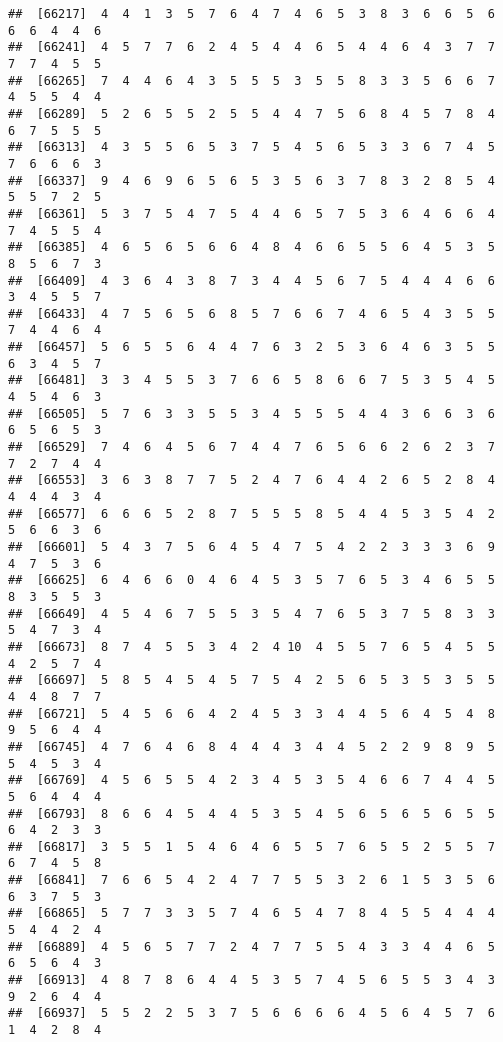 \documentclass[
]{book}
\begin{document}
\begin{verbatim}
##  [66217]  4  4  1  3  5  7  6  4  7  4  6  5  3  8  3  6  6  5  6  6  6  4  4  6
##  [66241]  4  5  7  7  6  2  4  5  4  4  6  5  4  4  6  4  3  7  7  7  7  4  5  5
##  [66265]  7  4  4  6  4  3  5  5  5  3  5  5  8  3  3  5  6  6  7  4  5  5  4  4
##  [66289]  5  2  6  5  5  2  5  5  4  4  7  5  6  8  4  5  7  8  4  6  7  5  5  5
##  [66313]  4  3  5  5  6  5  3  7  5  4  5  6  5  3  3  6  7  4  5  7  6  6  6  3
##  [66337]  9  4  6  9  6  5  6  5  3  5  6  3  7  8  3  2  8  5  4  5  5  7  2  5
##  [66361]  5  3  7  5  4  7  5  4  4  6  5  7  5  3  6  4  6  6  4  7  4  5  5  4
##  [66385]  4  6  5  6  5  6  6  4  8  4  6  6  5  5  6  4  5  3  5  8  5  6  7  3
##  [66409]  4  3  6  4  3  8  7  3  4  4  5  6  7  5  4  4  4  6  6  3  4  5  5  7
##  [66433]  4  7  5  6  5  6  8  5  7  6  6  7  4  6  5  4  3  5  5  7  4  4  6  4
##  [66457]  5  6  5  5  6  4  4  7  6  3  2  5  3  6  4  6  3  5  5  6  3  4  5  7
##  [66481]  3  3  4  5  5  3  7  6  6  5  8  6  6  7  5  3  5  4  5  4  5  4  6  3
##  [66505]  5  7  6  3  3  5  5  3  4  5  5  5  4  4  3  6  6  3  6  6  5  6  5  3
##  [66529]  7  4  6  4  5  6  7  4  4  7  6  5  6  6  2  6  2  3  7  7  2  7  4  4
##  [66553]  3  6  3  8  7  7  5  2  4  7  6  4  4  2  6  5  2  8  4  4  4  4  3  4
##  [66577]  6  6  6  5  2  8  7  5  5  5  8  5  4  4  5  3  5  4  2  5  6  6  3  6
##  [66601]  5  4  3  7  5  6  4  5  4  7  5  4  2  2  3  3  3  6  9  4  7  5  3  6
##  [66625]  6  4  6  6  0  4  6  4  5  3  5  7  6  5  3  4  6  5  5  8  3  5  5  3
##  [66649]  4  5  4  6  7  5  5  3  5  4  7  6  5  3  7  5  8  3  3  5  4  7  3  4
##  [66673]  8  7  4  5  5  3  4  2  4 10  4  5  5  7  6  5  4  5  5  4  2  5  7  4
##  [66697]  5  8  5  4  5  4  5  7  5  4  2  5  6  5  3  5  3  5  5  4  4  8  7  7
##  [66721]  5  4  5  6  6  4  2  4  5  3  3  4  4  5  6  4  5  4  8  9  5  6  4  4
##  [66745]  4  7  6  4  6  8  4  4  4  3  4  4  5  2  2  9  8  9  5  5  4  5  3  4
##  [66769]  4  5  6  5  5  4  2  3  4  5  3  5  4  6  6  7  4  4  5  5  6  4  4  4
##  [66793]  8  6  6  4  5  4  4  5  3  5  4  5  6  5  6  5  6  5  5  6  4  2  3  3
##  [66817]  3  5  5  1  5  4  6  4  6  5  5  7  6  5  5  2  5  5  7  6  7  4  5  8
##  [66841]  7  6  6  5  4  2  4  7  7  5  5  3  2  6  1  5  3  5  6  6  3  7  5  3
##  [66865]  5  7  7  3  3  5  7  4  6  5  4  7  8  4  5  5  4  4  4  5  4  4  2  4
##  [66889]  4  5  6  5  7  7  2  4  7  7  5  5  4  3  3  4  4  6  5  6  5  6  4  3
##  [66913]  4  8  7  8  6  4  4  5  3  5  7  4  5  6  5  5  3  4  3  9  2  6  4  4
##  [66937]  5  5  2  2  5  3  7  5  6  6  6  6  4  5  6  4  5  7  6  1  4  2  8  4

\end{verbatim}
\end{document}
